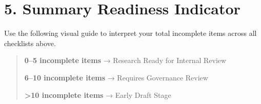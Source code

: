 \documentclass[
]{report}
\begin{document}
\chapter{5. Summary Readiness
Indicator}\label{summary-readiness-indicator}

Use the following visual guide to interpret your total incomplete items
across all checklists above.

\begin{quote}
\textbf{0--5 incomplete items} → Research Ready for Internal Review

\textbf{6--10 incomplete items} → Requires Governance Review

\textbf{\textgreater10 incomplete items} → Early Draft Stage
\end{quote}
\end{document}
